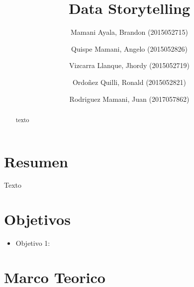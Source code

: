\documentclass[preprint,12pt]{elsarticle}
\begin{document}
	
	\begin{frontmatter}
		
		
		\title{\huge Data Storytelling}
		
		\author{Mamani Ayala, Brandon        (2015052715)}
		\author{Quispe Mamani, Angelo	      (2015052826)}
		\author{Vizcarra Llanque, Jhordy	      (2015052719)}
		\author{Ordoñez Quilli, Ronald          (2015052821)}
		\author{Rodriguez Mamani, Juan      (2017057862)}
		
		\address{Tacna, Perú}
		
		\begin{abstract}
			texto
	
		\end{abstract}
\end{frontmatter}

	
	
	\section{Resumen}
		Texto
\\

	
	

\section{Objetivos}
		\begin{itemize}
		\item Objetivo 1: 
	\end{itemize}

	
	

\section{Marco Teorico}
	
\end{document}
